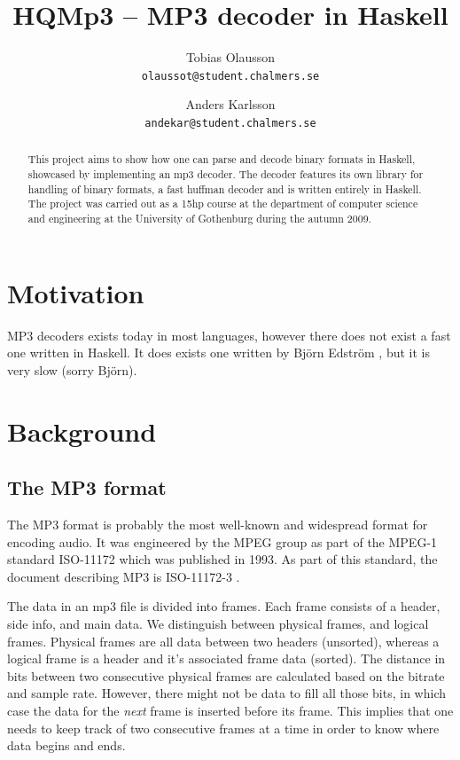 \documentclass[a4paper,12pt]{article}
\title{HQMp3 -- MP3 decoder in Haskell}
\author{Tobias Olausson \\ \texttt{\small{olaussot@student.chalmers.se}} \and
        Anders Karlsson \\ \texttt{\small{andekar@student.chalmers.se}}
}
\date{ \rule{0.8 \linewidth}{0.5mm} \\[3mm]
       University of Gothenburg \\
       \small{\today}
}
\begin{document}
\maketitle

\begin{abstract}
    This project aims to show how one can parse and decode binary formats in
    Haskell, showcased by implementing an mp3 decoder. The decoder features its
    own library for handling of binary formats, a fast huffman decoder and is
    written entirely in Haskell. The project was carried out as a 15hp course at
    the department of computer science and engineering at the University of
    Gothenburg during the autumn 2009.
\end{abstract}

\tableofcontents

\section{Motivation}
    MP3 decoders exists today in most languages, however there does not exist
    a fast one written in Haskell. It does exists one written by Björn Edström
    \cite{bjorn}, but it is very slow (sorry
    Björn).

\section{Background}
    \subsection{The MP3 format}
       The MP3 format is probably the most well-known and widespread format for
       encoding audio. It was engineered by the MPEG group as part of the MPEG-1
       standard ISO-11172 which was published in 1993. As part of this standard,
       the document describing MP3 is ISO-11172-3 \cite{wikimp3,wikimpeg1}.

       The data in an mp3 file is divided into frames. Each frame consists of
       a header, side info, and main data. We distinguish between physical
       frames, and logical frames. Physical frames are all data between two
       headers (unsorted), whereas a logical frame is a header and it's
       associated frame data (sorted). The distance in bits between two
       consecutive physical frames are calculated based on the bitrate and sample
       rate. However, there might not be data to fill all those bits, in which
       case the data for the \textit{next} frame is inserted before its frame.
       This implies that one needs to keep track of two consecutive frames at a
       time in order to know where data begins and ends.
\end{document}
